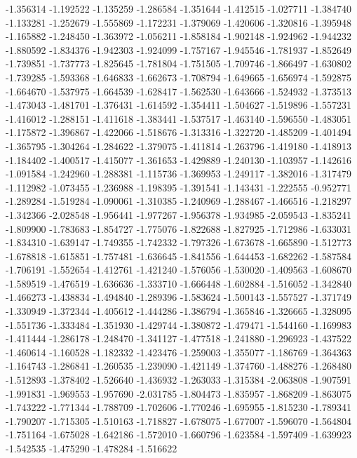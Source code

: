 -1.356314
-1.192522
-1.135259
-1.286584
-1.351644
-1.412515
-1.027711
-1.384740
-1.133281
-1.252679
-1.555869
-1.172231
-1.379069
-1.420606
-1.320816
-1.395948
-1.165882
-1.248450
-1.363972
-1.056211
-1.858184
-1.902148
-1.924962
-1.944232
-1.880592
-1.834376
-1.942303
-1.924099
-1.757167
-1.945546
-1.781937
-1.852649
-1.739851
-1.737773
-1.825645
-1.781804
-1.751505
-1.709746
-1.866497
-1.630802
-1.739285
-1.593368
-1.646833
-1.662673
-1.708794
-1.649665
-1.656974
-1.592875
-1.664670
-1.537975
-1.664539
-1.628417
-1.562530
-1.643666
-1.524932
-1.373513
-1.473043
-1.481701
-1.376431
-1.614592
-1.354411
-1.504627
-1.519896
-1.557231
-1.416012
-1.288151
-1.411618
-1.383441
-1.537517
-1.463140
-1.596550
-1.483051
-1.175872
-1.396867
-1.422066
-1.518676
-1.313316
-1.322720
-1.485209
-1.401494
-1.365795
-1.304264
-1.284622
-1.379075
-1.411814
-1.263796
-1.419180
-1.418913
-1.184402
-1.400517
-1.415077
-1.361653
-1.429889
-1.240130
-1.103957
-1.142616
-1.091584
-1.242960
-1.288381
-1.115736
-1.369953
-1.249117
-1.382016
-1.317479
-1.112982
-1.073455
-1.236988
-1.198395
-1.391541
-1.143431
-1.222555
-0.952771
-1.289284
-1.519284
-1.090061
-1.310385
-1.240969
-1.288467
-1.466516
-1.218297
-1.342366
-2.028548
-1.956441
-1.977267
-1.956378
-1.934985
-2.059543
-1.835241
-1.809900
-1.783683
-1.854727
-1.775076
-1.822688
-1.827925
-1.712986
-1.633031
-1.834310
-1.639147
-1.749355
-1.742332
-1.797326
-1.673678
-1.665890
-1.512773
-1.678818
-1.615851
-1.757481
-1.636645
-1.841556
-1.644453
-1.682262
-1.587584
-1.706191
-1.552654
-1.412761
-1.421240
-1.576056
-1.530020
-1.409563
-1.608670
-1.589519
-1.476519
-1.636636
-1.333710
-1.666448
-1.602884
-1.516052
-1.342840
-1.466273
-1.438834
-1.494840
-1.289396
-1.583624
-1.500143
-1.557527
-1.371749
-1.330949
-1.372344
-1.405612
-1.444286
-1.386794
-1.365846
-1.326665
-1.328095
-1.551736
-1.333484
-1.351930
-1.429744
-1.380872
-1.479471
-1.544160
-1.169983
-1.411444
-1.286178
-1.248470
-1.341127
-1.477518
-1.241880
-1.296923
-1.437522
-1.460614
-1.160528
-1.182332
-1.423476
-1.259003
-1.355077
-1.186769
-1.364363
-1.164743
-1.286841
-1.260535
-1.239090
-1.421149
-1.374760
-1.488276
-1.268480
-1.512893
-1.378402
-1.526640
-1.436932
-1.263033
-1.315384
-2.063808
-1.907591
-1.991831
-1.969553
-1.957690
-2.031785
-1.804473
-1.835957
-1.868209
-1.863075
-1.743222
-1.771344
-1.788709
-1.702606
-1.770246
-1.695955
-1.815230
-1.789341
-1.790207
-1.715305
-1.510163
-1.718827
-1.678075
-1.677007
-1.596070
-1.564804
-1.751164
-1.675028
-1.642186
-1.572010
-1.660796
-1.623584
-1.597409
-1.639923
-1.542535
-1.475290
-1.478284
-1.516622
